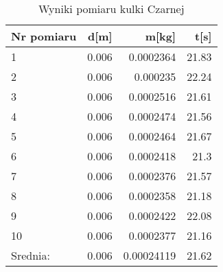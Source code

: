 \documentclass{article}
\begin{document}
\begin{center}   
    \begin{table}[h]
        \caption{Wyniki pomiaru kulki Czarnej}
        \centering
        \begin{tabular}{|l|r|r|r|}
            \hline
            Nr pomiaru & d[m] & m[kg] & t[s] \\ \hline
            1 & 0.006 & 0.0002364 & 21.83 \\ \hline
            2 & 0.006 & 0.000235  & 22.24 \\ \hline
            3 & 0.006 & 0.0002516 & 21.61 \\ \hline
            4 & 0.006 & 0.0002474 & 21.56 \\ \hline
            5 & 0.006 & 0.0002464 & 21.67 \\ \hline
            6 & 0.006 & 0.0002418 & 21.3  \\ \hline
            7 & 0.006 & 0.0002376 & 21.57 \\ \hline
            8 & 0.006 & 0.0002358 & 21.18 \\ \hline
            9 & 0.006 & 0.0002422 & 22.08 \\ \hline
            10& 0.006 & 0.0002377 & 21.16 \\ \hline
            Srednia: & 0.006 & 0.00024119 & 21.62 \\ \hline
        \end{tabular}%
        \label{tab:Tabela Pomiarow Kulki Czarnej}%
    \end{table}%
\end{center}

\end{document}
